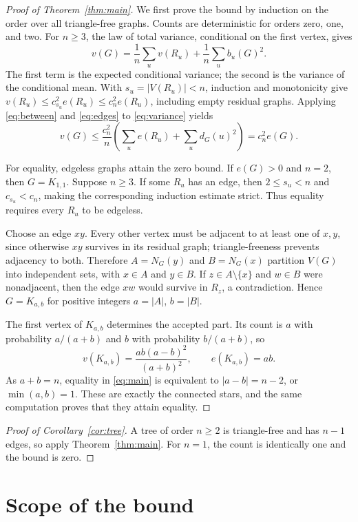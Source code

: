 \documentclass[11pt]{article}
\begin{document}
\begin{proof}[Proof of Theorem~\ref{thm:main}]
We first prove the bound by induction on the order over all triangle-free graphs. Counts are deterministic for orders zero, one, and two. For $n\ge3$, the law of total variance, conditional on the first vertex, gives
\begin{equation}\label{eq:variance}
 v(G)=\frac1n\sum_u v(R_u)+\frac1n\sum_u b_u(G)^2.
\end{equation}
The first term is the expected conditional variance; the second is the variance of the conditional mean. With $s_u=|V(R_u)|<n$, induction and monotonicity give $v(R_u)\le c_{s_u}^2e(R_u)\le c_n^2e(R_u)$, including empty residual graphs. Applying \eqref{eq:between} and \eqref{eq:edges} to \eqref{eq:variance} yields
\[
 v(G)\le\frac{c_n^2}{n}\left(\sum_u e(R_u)+\sum_u d_G(u)^2\right)
       =c_n^2 e(G).
\]

For equality, edgeless graphs attain the zero bound. If $e(G)>0$ and $n=2$, then $G=K_{1,1}$. Suppose $n\ge3$. If some $R_u$ has an edge, then $2\le s_u<n$ and $c_{s_u}<c_n$, making the corresponding induction estimate strict. Thus equality requires every $R_u$ to be edgeless.

Choose an edge $xy$. Every other vertex must be adjacent to at least one of $x,y$, since otherwise $xy$ survives in its residual graph; triangle-freeness prevents adjacency to both. Therefore $A=N_G(y)$ and $B=N_G(x)$ partition $V(G)$ into independent sets, with $x\in A$ and $y\in B$. If $z\in A\setminus\{x\}$ and $w\in B$ were nonadjacent, then the edge $xw$ would survive in $R_z$, a contradiction. Hence $G=K_{a,b}$ for positive integers $a=|A|$, $b=|B|$.

The first vertex of $K_{a,b}$ determines the accepted part. Its count is $a$ with probability $a/(a+b)$ and $b$ with probability $b/(a+b)$, so
\[
 v(K_{a,b})=\frac{ab(a-b)^2}{(a+b)^2},\qquad e(K_{a,b})=ab.
\]
As $a+b=n$, equality in \eqref{eq:main} is equivalent to $|a-b|=n-2$, or $\min(a,b)=1$. These are exactly the connected stars, and the same computation proves that they attain equality.
\end{proof}

\begin{proof}[Proof of Corollary~\ref{cor:tree}]
A tree of order $n\ge2$ is triangle-free and has $n-1$ edges, so apply Theorem~\ref{thm:main}. For $n=1$, the count is identically one and the bound is zero.
\end{proof}

\section{Scope of the bound}
\end{document}
